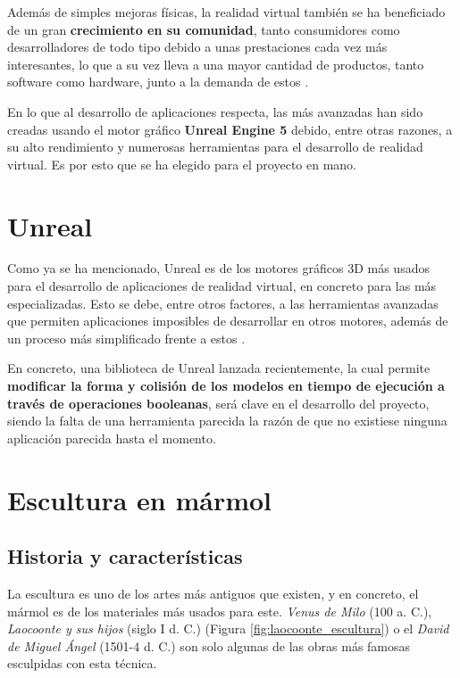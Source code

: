 Además de simples mejoras físicas, la realidad virtual también se ha beneficiado de un gran \textbf{crecimiento en su comunidad}, tanto consumidores como desarrolladores de todo tipo debido a unas prestaciones cada vez más interesantes, lo que a su vez lleva a una mayor cantidad de productos, tanto software como hardware, junto a la demanda de estos \cite{vr_evolution}.

En lo que al desarrollo de aplicaciones respecta, las más avanzadas han sido creadas usando el motor gráfico \textbf{Unreal Engine 5} debido, entre otras razones, a su alto rendimiento y numerosas herramientas para el desarrollo de realidad virtual. Es por esto que se ha elegido para el proyecto en mano.

\section{Unreal}

Como ya se ha mencionado, Unreal es de los motores gráficos 3D más usados para el desarrollo de aplicaciones de realidad virtual, en concreto para las más especializadas. Esto se debe, entre otros factores, a las herramientas avanzadas que permiten aplicaciones imposibles de desarrollar en otros motores, además de un proceso más simplificado frente a estos \cite{unreal}.

En concreto, una biblioteca de Unreal lanzada recientemente, la cual permite \textbf{modificar la forma y colisión de los modelos en tiempo de ejecución a través de operaciones booleanas}, será clave en el desarrollo del proyecto, siendo la falta de una herramienta parecida la razón de que no existiese ninguna aplicación parecida hasta el momento.

\section{Escultura en mármol}

\subsection{Historia y características}

La escultura es uno de los artes más antiguos que existen, y en concreto, el mármol es de los materiales más usados para este. \textit{Venus de Milo} (100 a. C.), \textit{Laocoonte y sus hijos} (siglo I d. C.) (Figura \ref{fig:laocoonte_escultura}) o el \textit{David de Miguel Ángel} (1501-4 d. C.) son solo algunas de las obras más famosas esculpidas con esta técnica.

